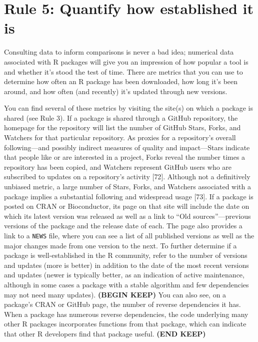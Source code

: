 \documentclass[10pt,letterpaper]{article}
\begin{document}
\hypertarget{rule-5-quantify-how-established-it-is}{%
\section{Rule 5: Quantify how established it
is}\label{rule-5-quantify-how-established-it-is}}

Consulting data to inform comparisons is never a bad idea; numerical
data associated with R packages will give you an impression of how
popular a tool is and whether it's stood the test of time. There are
metrics that you can use to determine how often an R package has been
downloaded, how long it's been around, and how often (and recently) it's
updated through new versions.

You can find several of these metrics by visiting the site(s) on which a
package is shared (see Rule 3). If a package is shared through a GitHub
repository, the homepage for the repository will list the number of
GitHub Stars, Forks, and Watchers for that particular repository. As
proxies for a repository's overall following---and possibly indirect
measures of quality and impact---Stars indicate that people like or are
interested in a project, Forks reveal the number times a repository has
been copied, and Watchers represent GitHub users who are subscribed to
updates on a repository's activity {[}72{]}. Although not a definitively
unbiased metric, a large number of Stars, Forks, and Watchers associated
with a package implies a substantial following and widespread usage
{[}73{]}. If a package is posted on CRAN or Bioconductor, its page on
that site will include the date on which its latest version was released
as well as a link to ``Old sources''---previous versions of the package
and the release date of each. The page also provides a link to a
\texttt{NEWS} file, where you can see a list of all published versions
as well as the major changes made from one version to the next. To
further determine if a package is well-established in the R community,
refer to the number of versions and updates (more is better) in addition
to the date of the most recent versions and updates (newer is typically
better, as an indication of active maintenance, although in some cases a
package with a stable algorithm and few dependencies may not need many
updates). \textbf{(BEGIN KEEP)} You can also see, on a package's CRAN or
GitHub page, the number of reverse dependencies it has. When a package
has numerous reverse dependencies, the code underlying many other R
packages incorporates functions from that package, which can indicate
that other R developers find that package useful. \textbf{(END KEEP)}
\end{document}
